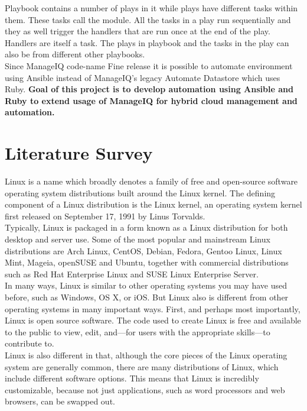 \documentclass[a4paper,12pt]{report}
\begin{document}
Playbook contains a number of plays in it while plays have different tasks within them. These tasks call the module. All the tasks in a play run sequentially and they as well trigger the handlers that are run once at the end of the play. Handlers are itself a task. The plays in playbook and the tasks in the play can also be from different other playbooks.\\

Since ManageIQ code-name Fine release it is possible to automate environment using Ansible instead of ManageIQ's legacy Automate Datastore which uses Ruby. \textbf{Goal of this project is to develop automation using Ansible and Ruby to extend usage of ManageIQ for hybrid cloud management and automation.}


\chapter{Literature Survey}

Linux is a name which broadly denotes a family of free and open-source software operating system distributions built around the Linux kernel. The defining component of a Linux distribution is the Linux kernel, an operating system kernel first released on September 17, 1991 by Linus Torvalds.\\

Typically, Linux is packaged in a form known as a Linux distribution for both desktop and server use. Some of the most popular and mainstream Linux distributions are Arch Linux, CentOS, Debian, Fedora, Gentoo Linux, Linux Mint, Mageia, openSUSE and Ubuntu, together with commercial distributions such as Red Hat Enterprise Linux and SUSE Linux Enterprise Server.\\

In many ways, Linux is similar to other operating systems you may have used before, such as Windows, OS X, or iOS. But Linux also is different from other operating systems in many important ways. First, and perhaps most importantly, Linux is open source software. The code used to create Linux is free and available to the public to view, edit, and—for users with the appropriate skills—to contribute to.\\

Linux is also different in that, although the core pieces of the Linux operating system are generally common, there are many distributions of Linux, which include different software options. This means that Linux is incredibly customizable, because not just applications, such as word processors and web browsers, can be swapped out.\\
\end{document}
